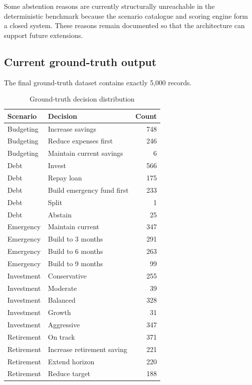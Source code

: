 \documentclass[12pt,a4paper]{article}
\begin{document}
Some abstention reasons are currently structurally unreachable in the deterministic benchmark because the scenario catalogue and scoring engine form a closed system. These reasons remain documented so that the architecture can support future extensions.

\subsection{Current ground-truth output}

The final ground-truth dataset contains exactly 5,000 records.

\begin{table}[H]
\centering
\caption{Ground-truth decision distribution}
\label{tab:gt}
\begin{tabular}{llr}
\toprule
Scenario & Decision & Count\\
\midrule
Budgeting & Increase savings & 748\\
Budgeting & Reduce expenses first & 246\\
Budgeting & Maintain current savings & 6\\
\midrule
Debt & Invest & 566\\
Debt & Repay loan & 175\\
Debt & Build emergency fund first & 233\\
Debt & Split & 1\\
Debt & Abstain & 25\\
\midrule
Emergency & Maintain current & 347\\
Emergency & Build to 3 months & 291\\
Emergency & Build to 6 months & 263\\
Emergency & Build to 9 months & 99\\
\midrule
Investment & Conservative & 255\\
Investment & Moderate & 39\\
Investment & Balanced & 328\\
Investment & Growth & 31\\
Investment & Aggressive & 347\\
\midrule
Retirement & On track & 371\\
Retirement & Increase retirement saving & 221\\
Retirement & Extend horizon & 220\\
Retirement & Reduce target & 188\\
\bottomrule
\end{tabular}
\end{table}
\end{document}
